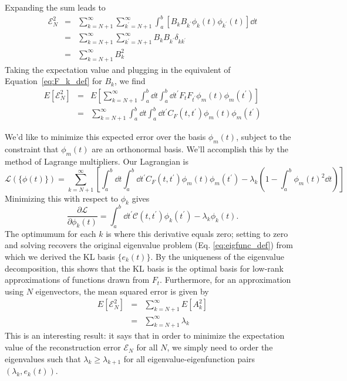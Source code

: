 Expanding the sum leads to
\begin{eqnarray}
  \mathcal{E}^2_N &=& \sum_{k=N + 1}^\infty
  \sum_{k^\prime=N + 1}^\infty \int_a^b 
  \left[B_k B_{k^\prime} \phi_k(t) \phi_{k^\prime}(t)\right] \dd t
  \nonumber\\
  &=& \sum_{k=N+1}^\infty \sum_{k^\prime=N+1}^\infty B_k B_{k^\prime}
  \delta_{kk^\prime}\nonumber\\
  &=& \sum_{k=N+1}^\infty B_k^2
\end{eqnarray}
Taking the expectation value and plugging in the equivalent of
Equation~\ref{eq:F_k_def} for $B_k$, we find
\begin{eqnarray}
  E[\mathcal{E}^2_N] &=&
  E\left[\sum_{k=N+1}^\infty \int_a^b \dd t \int_a^b \dd t^\prime
  F_tF_{t^\prime} \phi_m(t)\phi_m(t^\prime)\right] \nonumber\\
  &=& \sum_{k=N+1}^\infty \int_a^b \dd t \int_a^b \dd t^\prime
  C_F(t, t^\prime) \phi_m(t)\phi_m(t^\prime)
\end{eqnarray}

We'd like to minimize this expected error over the basis $\phi_m(t)$, subject
to the constraint that $\phi_m(t)$ are an orthonormal basis.  We'll accomplish
this by the method of Lagrange multipliers.  Our Lagrangian is
\begin{equation}
  \mathcal{L}(\{\phi(t)\}) = \sum_{k=N+1}^\infty
  \left[\int_a^b \dd t \int_a^b \dd t^\prime
  C_F(t, t^\prime) \phi_m(t)\phi_m(t^\prime)
  - \lambda_k\left(1 - \int_a^b \phi_m(t)^2 \dd t\right)
  \right]
\end{equation}
Minimizing this with respect to $\phi_k$ gives
\begin{equation}
  \frac{\partial\mathcal{L}}{\partial\phi_k(t)} = \int_a^b \dd t^\prime
  \mathcal{C}(t, t^\prime) \phi_k(t^\prime)
  - \lambda_k \phi_k(t).
\end{equation}
The optimumum for each $k$ is where this derivative equals zero; setting to
zero and solving recovers the original eigenvalue problem
 (Eq. \ref{eq:eigfunc_def}) from which we
derived the KL basis $\{e_k(t)\}$.  By the uniqueness of the eigenvalue
decomposition, this shows that the KL basis is the optimal basis for low-rank
approximations of functions drawn from $F_t$.  Furthermore, for an
approximation using $N$ eigenvectors, the mean squared error is given by
\begin{eqnarray}
  E[\mathcal{E}^2_N] &=& \sum_{k=N+1}^\infty E[A_k^2]\nonumber\\
  &=& \sum_{k=N+1}^\infty \lambda_k
\end{eqnarray}
This is an interesting result: it says that in order to minimize the
expectation value of the reconstruction error $\mathcal{E}_N$ for all $N$,
we simply need to order the eigenvalues such that $\lambda_k \ge \lambda_{k+1}$
for all eigenvalue-eigenfunction pairs $(\lambda_k, e_k(t))$.

